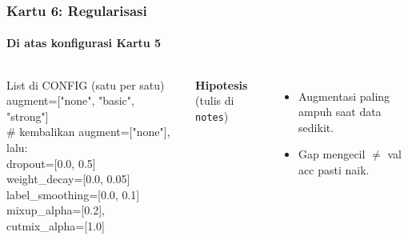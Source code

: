 \documentclass[t,aspectratio=169,xcolor={dvipsnames,table}]{beamer}
\begin{document}
\begin{frame}
    \frametitle{Kartu 6: Regularisasi}
    \framesubtitle{Di atas konfigurasi Kartu 5}
    \footnotesize

    \begin{columns}[T]
        \begin{block}{List di CONFIG (satu per satu)}
            {\ttfamily\scriptsize augment=["none", "basic", "strong"]\\\# kembalikan augment=["none"], lalu:\\dropout=[0.0, 0.5]\\weight\_decay=[0.0, 0.05]\\label\_smoothing=[0.0, 0.1]\\mixup\_alpha=[0.2], cutmix\_alpha=[1.0]}
        \end{block}
        \textbf{Hipotesis} (tulis di \texttt{notes})
        \begin{itemize}
            \item Augmentasi paling ampuh saat data sedikit.
            \item Gap mengecil $\neq$ val acc pasti naik.
        \end{itemize}


\end{columns}
\end{frame}
\end{document}
